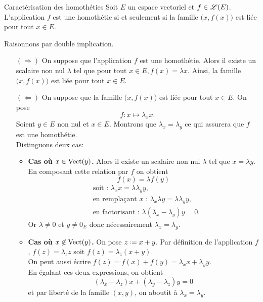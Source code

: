 \begin{prop}{Caractérisation des homothéties}
    Soit $E$ un espace vectoriel et $f \in \mathscr{L}(E)$. L'application $f$ est une homothétie si et seulement si la famille $\big(x, f(x) \big)$ est liée pour tout $x \in E$.
\end{prop}

\begin{marginfigure}
    \centering
    
\end{marginfigure}

\begin{preuve}
    Raisonnons par double implication. 
    \begin{itemize}
        \item[$(\Rightarrow)$] On suppose que l'application $f$ est une homothétie. Alors il existe un scalaire non nul $\lambda$ tel que pour tout $x \in E, f(x) = \lambda x$. Ainsi, la famille $\big(x, f(x) \big)$ est liée pour tout $x \in E$. 
        \item[$(\Leftarrow)$]  On suppose que la famille $\big(x, f(x) \big)$ est liée pour tout $x \in E$. On pose 
        $$f:x \mapsto \lambda_x x.$$
        Soient $y \in E$ non nul et $x \in E$. Montrons que $\lambda_x = \lambda_{y}$ ce qui assurera que $f$ est une homothétie. \\
        Distinguons deux cas:
        \begin{itemize}
            \item \textbf{Cas où $x \in \mathrm{Vect}(y)$.} Alors il existe un scalaire non nul $\lambda$ tel que $x = \lambda y$. En composant cette relation par $f$ on obtient
            $$f(x) = \lambda f(y)$$
            \begin{align*}
                &\text{soit : } \lambda_x x = \lambda \lambda_{y} y, \\
                &\text{en remplaçant $x$ : } \lambda_x \lambda y = \lambda \lambda_{y} y, \\
                &\text{en factorisant : } \lambda (\lambda_x - \lambda_{y}) y = 0.
            \end{align*}
            Or $\lambda \not= 0$ et $y \not= 0_E$ donc nécessairement $\lambda_x = \lambda_{y}$.
            \item \textbf{Cas où $x \not \in \mathrm{Vect}(y)$.} On pose $z \defeq x + y$. Par définition de l'application $f$, $f(z) = \lambda_z z$ soit $f(z) = \lambda_z(x + y)$. \\
            On peut aussi écrire $f(z) = f(x) + f(y) = \lambda_x x + \lambda_y y$. \\
            En égalant ces deux expressions, on obtient 
            $$(\lambda_x - \lambda_z) x + (\lambda_{y} - \lambda_z) y = 0$$
            et par liberté de la famille $(x, y)$, on aboutit à $\lambda_x = \lambda_{y}$.
        \end{itemize}
    \end{itemize}
\end{preuve}
